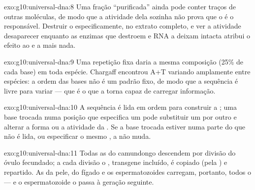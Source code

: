 \begin{solution}{exo:g10:universal-dna:8}
Uma fração ``purificada'' ainda pode conter traços de outras moléculas,
de modo que a atividade dela sozinha não prova que o  é o
responsável. Destruir o  especificamente, no extrato completo, e ver
a atividade desaparecer enquanto as enzimas que destroem  e RNA
a deixam intacta atribui o efeito ao  e a mais nada.
\end{solution}

\begin{solution}{exo:g10:universal-dna:9}
Uma repetição fixa daria a mesma composição (25\% de cada base) em toda
espécie. Chargaff encontrou A+T variando amplamente entre espécies: a
ordem das bases não é um padrão fixo, de modo que a sequência é livre
para variar --- que é o que a torna capaz de carregar informação.
\end{solution}

\begin{solution}{exo:g10:universal-dna:10}
A sequência é lida em ordem para construir a ; uma base trocada
numa posição que especifica um  pode substituir um 
por outro e alterar a forma ou a atividade da . Se a base
trocada estiver numa parte do  que não é lida, ou especificar o
mesmo , a  não muda.
\end{solution}

\begin{solution}{exo:g10:universal-dna:11}
Todas as  do camundongo descendem por divisão do óvulo
fecundado; a cada divisão o , transgene incluído, é copiado (pela
) e repartido. As  da pele, do fígado e os
espermatozoides carregam, portanto, todos o  --- e o espermatozoide
o passa à geração seguinte.
\end{solution}


